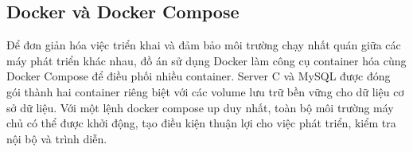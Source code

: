 \subsection{Docker và Docker Compose}

Để đơn giản hóa việc triển khai và đảm bảo môi trường chạy nhất quán giữa các máy phát triển khác nhau, đồ án sử dụng Docker làm công cụ container hóa cùng Docker Compose để điều phối nhiều container. Server C và MySQL được đóng gói thành hai container riêng biệt với các volume lưu trữ bền vững cho dữ liệu cơ sở dữ liệu. Với một lệnh docker compose up duy nhất, toàn bộ môi trường máy chủ có thể được khởi động, tạo điều kiện thuận lợi cho việc phát triển, kiểm tra nội bộ và trình diễn.
